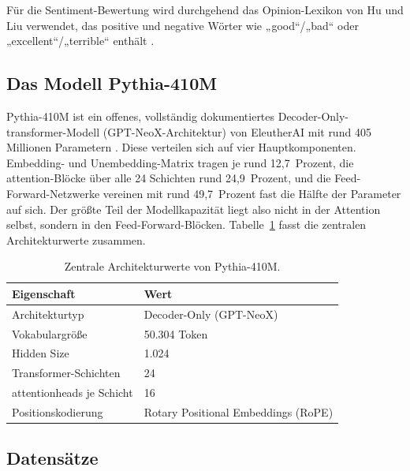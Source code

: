 Für die Sentiment-Bewertung wird durchgehend das Opinion-Lexikon von Hu und Liu verwendet, das positive und negative Wörter wie „good“/„bad“ oder „excellent“/„terrible“ enthält \cite{hu2004mining}.

\subsection{Das Modell Pythia-410M}

Pythia-410M ist ein offenes, vollständig dokumentiertes Decoder-Only-\gls{transformer}-Modell (GPT-NeoX-Architektur) von EleutherAI mit rund 405 Millionen Parametern \cite{biderman2023pythia}. Diese verteilen sich auf vier Hauptkomponenten. Embedding- und Unembedding-Matrix tragen je rund 12,7~Prozent, die \gls{attention}-Blöcke über alle 24 Schichten rund 24,9~Prozent, und die Feed-Forward-Netzwerke vereinen mit rund 49,7~Prozent fast die Hälfte der Parameter auf sich. Der größte Teil der Modellkapazität liegt also nicht in der Attention selbst, sondern in den Feed-Forward-Blöcken. Tabelle~\ref{tab:arch} fasst die zentralen Architekturwerte zusammen.

\begin{table}[htbp]
  \centering
  \caption{Zentrale Architekturwerte von Pythia-410M.}
  \label{tab:arch}
  \begin{tabular}{ll}
    \toprule
    Eigenschaft & Wert \\
    \midrule
    Architekturtyp & Decoder-Only (GPT-NeoX) \\
    Vokabulargröße & 50.304 Token \\
    Hidden Size & 1.024 \\
    Transformer-Schichten & 24 \\
    \glspl{attentionhead} je Schicht & 16 \\
    Positionskodierung & Rotary Positional Embeddings (RoPE) \\
    \bottomrule
  \end{tabular}
\end{table}

\subsection{Datensätze}

